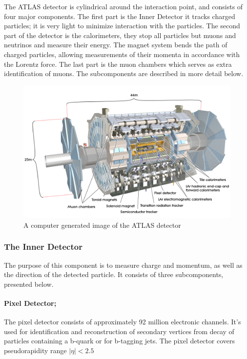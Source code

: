 \documentclass[12pt,a4paper]{article}
\numberwithin{equation}{section}
\begin{document}


The ATLAS detector is cylindrical around the interaction point, and consists of
four major components. The first part is the Inner Detector it tracks charged
particles; it is very light to minimize interaction with the particles. The
second part of the detector is the calorimeters, they stop all particles but
muons and neutrinos and measure their energy. The magnet system bends the path
of charged particles, allowing measurements of their momenta in accordance with
the Lorentz force. The last part is the muon chambers which serves as extra
identification of muons. The subcomponents are described in more detail below.

\begin{figure}[H]
	\centering
	\includegraphics[scale=0.1]{figures/atlas.jpg}
	\caption{A computer generated image of the ATLAS detector~\cite{detector}}\label{fig:detector}
\end{figure}

\subsubsection{The Inner Detector}
The purpose of this component is to measure charge and momentum, as well as the
direction of the detected particle. It consists of three subcomponents,
presented below.
\paragraph{Pixel Detector;}
The pixel detector consists of approximately 92 million electronic channels.
It's used for identification and reconstruction of secondary vertices from decay
of particles containing a b-quark or for b-tagging jets. The pixel detector
covers pseudorapidity range $|\eta| < 2.5 $
\end{document}
